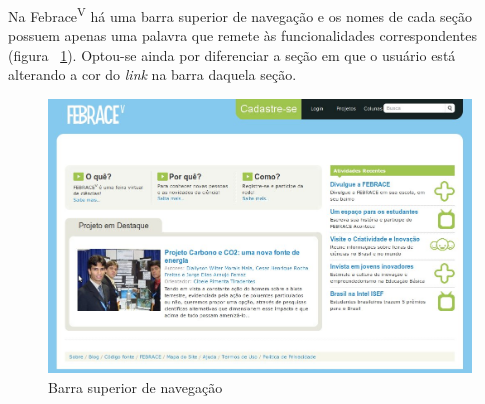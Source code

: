 Na Febrace\textsuperscript{V} há uma barra superior de navegação e os nomes de cada seção possuem apenas uma palavra que remete às funcionalidades correspondentes (figura ~\ref{home}). Optou-se ainda por diferenciar a seção em que o usuário está alterando a cor do \textit{link} na barra daquela seção. 

    \begin{figure}[h]
        \begin{center}
    \includegraphics[width=0.7\linewidth]{arquivos/home.png}
        \end{center}
        \caption{Barra superior de navegação}
        \label{home}
    \end{figure}

